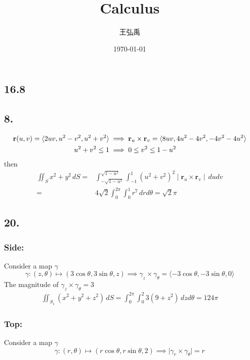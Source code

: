 \documentclass[12pt, a4paper]{article}
\title{\textbf{Calculus}}
\author{王弘禹}
\date\today
\begin{document}
\begin{CJK*}{UTF8}{bsmi}
\linespread{1.5}
\maketitle
\newcommand{\st}[1]{\section*{#1}}
\newcommand{\sst}[1]{\subsection*{#1}}
\newcommand{\ssst}[1]{\subsubsection*{#1}}
\newcommand{\dsp}{\displaystyle}
\newcommand{\dx}{\,dx}
\newcommand{\dphi}{\,d\phi}
\newcommand{\dtheta}{\,d\theta}
\newcommand{\dy}{\,dy}
\newcommand{\dz}{\,dz}
\newcommand{\dr}{\,dr}
\newcommand{\drho}{\,d\rho}
\newcommand{\tb}{\textbf}
\st{16.8}
\sst{8.}
\begin{align}
    \tb r (u,v) = \langle 2uv,u^2-v^2,u^2+v^2\rangle &\implies \tb{r}_u\times \tb{r}_v = \langle 8uv, 4u^2-4v^2, -4v^2-4u^2\rangle\\
    u^2+v^2 \le 1 &\implies 0 \le v^2 \le 1-u^2\\
\end{align}
then
\begin{align}
    \iint_S x^2+y^2 \,dS =& \int_{-\sqrt{1-u^2}}^{\sqrt{1-u^2}}\int_{-1}^1 {(u^2+v^2)}^2\mid\tb{r}_u \times \tb{r}_v\mid\,dudv\\
    =&4\sqrt{2}\int_0^{2\pi}\int_0^1 r^7\dr d\theta= \sqrt{2}\pi
\end{align}
\sst{20.}
\ssst{Side:}
Consider a map $\gamma$
\begin{equation}
    \gamma : (z,\theta)\longmapsto (3\cos \theta,3\sin\theta,z) \implies \gamma_z \times \gamma_\theta=\langle-3\cos\theta,-3\sin\theta,0 \rangle
\end{equation}
The magnitude of $\gamma_z \times \gamma_\theta = 3$
\begin{align}
    \iint_{S_1} (x^2+y^2+z^2)\,dS=\int_0^{2\pi}\int_0^2 3(9+z^2)\dz d\theta=124\pi
\end{align}
\ssst{Top:}
Consider a map $\gamma$
\begin{equation}
    \gamma : (r,\theta) \longmapsto (r\cos\theta, r\sin\theta, 2) \implies \mid \gamma_r\times \gamma_\theta \mid = r
\end{equation}

\end{CJK*}
\end{document}
